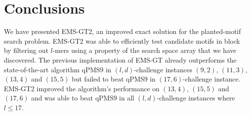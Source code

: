 \section{Conclusions}

We have presented EMS-GT2, an improved exact solution for the planted-motif search problem. EMS-GT2 was able to efficiently test candidate motifs in block by filtering out $l$-mers using a property of the search space array that we have discovered. The previous implementation of EMS-GT already outperforms the state-of-the-art algorithm qPMS9 in $(l, d)$-challenge instances $(9, 2)$, $(11, 3)$, $(13, 4)$ and $(15, 5)$ but failed to beat qPMS9 in $(17, 6)$-challenge instance. EMS-GT2 improved the algorithm's performance on $(13, 4)$, $(15, 5)$ and $(17, 6)$ and was able to beat qPMS9 in all $(l, d)$-challenge instances where $l \leq 17$.
